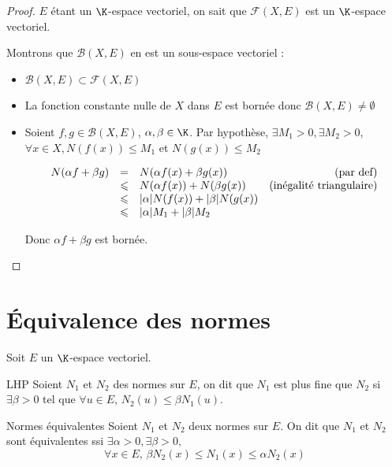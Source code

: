 \begin{proof}
    $E$ étant un $\K$-espace vectoriel, on sait que $\mathscr F(X, E)$ est un 
    $\K$-espace vectoriel. 

    
    Montrons que $\mathscr B(X, E)$ en est un sous-espace vectoriel :
    \begin{itemize}
        \item $\mathscr B(X, E) \subset \mathscr F(X, E)$
        \item La fonction constante nulle de $X$ dans $E$ est bornée donc $\mathscr B(X, E) \neq \emptyset$
        \item Soient $f, g \in \mathscr B(X, E)$, $\alpha, \beta \in \K$. Par hypothèse, 
            $\exists M_1 > 0, \exists M_2 > 0$, $\forall x \in X, N(f(x)) \leqslant M_1$ et 
            $N(g(x)) \leqslant M_2$

            \[
            \begin{array}{rclr}
                N(\alpha f + \beta g ) & = & N(\alpha f(x) + \beta g(x)) & \text{(par def)} \\
                \space & \leqslant & N(\alpha f(x)) + N(\beta g(x)) & \text{(inégalité triangulaire)} \\
                \space & \leqslant & |\alpha| N(f(x)) + |\beta| N(g(x)) \\
                \space & \leqslant & |\alpha| M_1 + |\beta| M_2\\
            \end{array}
            \]
            
            Donc $\alpha f + \beta g$ est bornée. 
    \end{itemize}
\end{proof}

\section{Équivalence des normes}

Soit $E$ un $\K$-espace vectoriel. 

\begin{definition}{LHP}
    Soient $N_1$ et $N_2$ des normes sur $E$, on dit que $N_1$ est plus fine que $N_2$ si $\exists \beta > 0$ tel que $\forall u \in E$, $N_2(u) \leqslant \beta N_1(u)$.    
\end{definition}

\begin{definition}{Normes équivalentes}{}
    Soient $N_1$ et $N_2$ deux normes sur $E$. On dit que $N_1$ et $N_2$ sont équivalentes ssi $ \exists \alpha > 0, \exists \beta > 0, $
    $$\forall x \in E, \, \beta N_2(x) \leqslant N_1(x) \leqslant \alpha N_2(x)$$
\end{definition}

